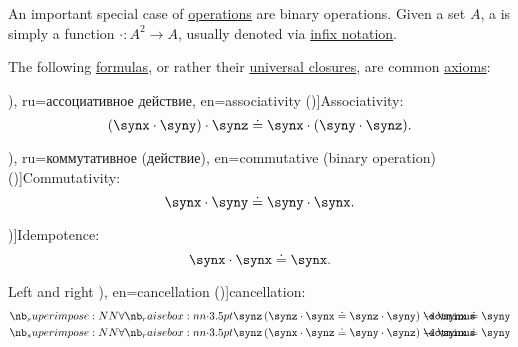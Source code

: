 \begin{definition}\label{def:binary_operation}
  An important special case of \hyperref[def:operation_on_set]{operations} are binary operations. Given a set \( A \), a  is simply a function \( \cdot: A^2 \to A \), usually denoted via \hyperref[def:function_application_syntax]{infix notation}.

  The following \hyperref[def:first_order_syntax/formula]{formulas}, or rather their \hyperref[def:universal_closure]{universal closures}, are common \hyperref[def:first_order_theory/axiomatized]{axioms}:
  \begin{thmenum}
     \term[bg=асоциативен закон (\cite[11]{ГеновМиховскиМоллов1991Алгебра}), ru=ассоциативное действие, en=associativity (\cite[12]{GowersEtAl2008PrincetonCompanion})]{Associativity}:
    \begin{equation}\label{eq:def:binary_operation/associative}
      (\synx \cdot \syny) \cdot \synz \syneq \synx \cdot (\syny \cdot \synz).
    \end{equation}

     \term[bg=комутативен (закон) (\cite[11]{ГеновМиховскиМоллов1991Алгебра}), ru=коммутативное (действие), en=commutative (binary operation) (\cite[12]{GowersEtAl2008PrincetonCompanion})]{Commutativity}:
    \begin{equation}\label{eq:def:binary_operation/commutative}
      \synx \cdot \syny \syneq \syny \cdot \synx.
    \end{equation}

     \term[ru=идемпотентная (операция), en=idempotent (operation) (\cite[\S A.2.1]{Mimram2020ProgramEqualsProof})]{Idempotence}:
    \begin{equation}\label{eq:def:binary_operation/idempotent}
      \synx \cdot \synx \syneq \synx.
    \end{equation}

     Left and right \term[ru=сокращение, bg=съкращение (\cite[77]{ГеновМиховскиМоллов1991Алгебра}), en=cancellation (\cite[218]{Kleene2002Logic})]{cancellation}:
    \begin{align}
      \qforall \synz (\synz \cdot \synx \syneq \synz \cdot \syny) \synimplies \synx \syneq \syny
      \label{eq:def:binary_operation/cancellative/left}
      \\
      \qforall \synz (\synx \cdot \synz \syneq \syny \cdot \synz) \synimplies \synx \syneq \syny
      \label{eq:def:binary_operation/cancellative/right}
    \end{align}
  \end{thmenum}
\end{definition}

